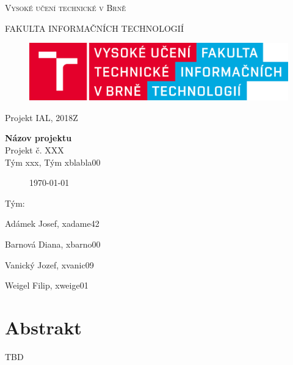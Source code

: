 \documentclass[a4paper,11pt]{article}
\begin{document}

\begin{titlepage}
\begin{center}
    {\Huge \textsc{Vysoké učení technické v Brně}}
    
    {\LARGE \uppercase{FAKULTA INFORMAČNÍCH TECHNOLOGIÍ}}
    
\begin{figure}[h]
\vspace{5.0cm}
\centering
\includegraphics[scale=0.15]{logo.png}
\vspace{-10.0cm}
\end{figure}
    
	{\LARGE Projekt IAL, 2018Z}

	{\Huge \textbf{Názov projektu}}
\\

{\LARGE {Projekt č. XXX}}\\
{\LARGE {Tým xxx, Tým xblabla00}}

\begin{figure}[h]
\centering
{\Large {\mydate\today}}
\vspace{6cm}
\end{figure}

\end{center}
\begin{compactitem}
\item[] Tým:
\item[] Adámek Josef, xadame42
\item[] Barnová Diana, xbarno00
\item[] Vanický Jozef, xvanic09
\item[] Weigel Filip, xweige01
\end{compactitem}

\end{titlepage}

\tableofcontents
\newpage

\section{Abstrakt}
TBD
\end{document}
